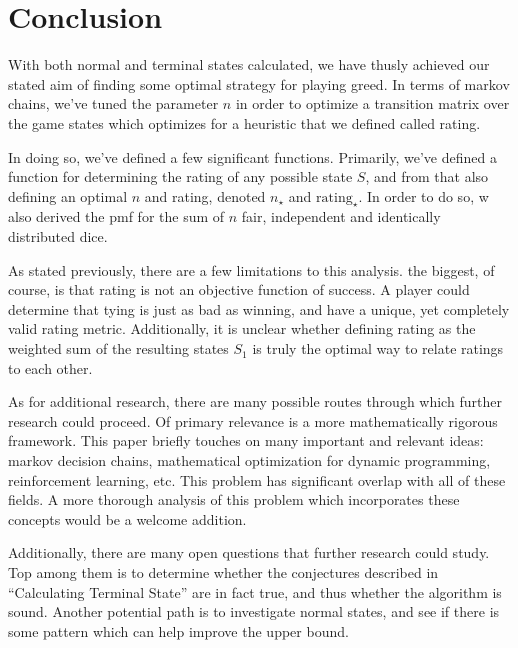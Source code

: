 \documentclass[a4paper]{article}
\begin{document}

\section{Conclusion}


With both normal and terminal states calculated, we have thusly achieved our stated aim of finding some optimal strategy for playing greed. In terms of markov chains, we've tuned the parameter $n$ in order to optimize a transition matrix over the game states which optimizes for a heuristic that we defined called rating. 


In doing so, we've defined a few significant functions. Primarily, we've defined a function for determining the rating of any possible state $S$, and from that also defining an optimal $n$ and rating, denoted $n_{\star}$ and $\text{rating}_{\star}$. In order to do so, w also derived the pmf for the sum of $n$ fair, independent and identically distributed dice. 


As stated previously, there are a few limitations to this analysis. the biggest, of course, is that rating is not an objective function of success. A player could determine that tying is just as bad as winning, and have a unique, yet completely valid rating metric. Additionally, it is unclear whether defining rating as the weighted sum of the resulting states $S_1$ is truly the optimal way to relate ratings to each other. 


As for additional research, there are many possible routes through which further research could proceed. Of primary relevance is a more mathematically rigorous framework. This paper briefly touches on many important and relevant ideas: markov decision chains, mathematical optimization for dynamic programming, reinforcement learning, etc. This problem has significant overlap with all of these fields. A more thorough analysis of this problem which incorporates these concepts would be a welcome addition.

Additionally, there are many open questions that further research could study. Top among them is to determine whether the conjectures described in ``Calculating Terminal State'' are in fact true, and thus whether the algorithm is sound. Another potential path is to investigate normal states, and see if there is some pattern which can help improve the upper bound. 
\end{document}
